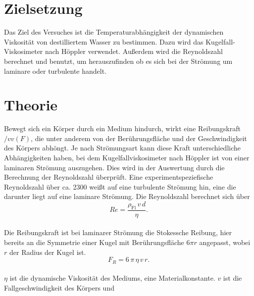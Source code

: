 \section{Zielsetzung}
\label{sec:Zielsetzung}
Das Ziel des Versuches ist die Temperaturabhängigkeit der dynamischen 
Viskosität von destilliertem Wasser zu bestimmen. Dazu wird das Kugelfall-
Viskosimeter nach Höppler verwendet. Außerdem wird die Reynoldszahl 
berechnet und benutzt, um herauszufinden ob es sich bei der Strömung um 
laminare oder turbulente handelt. 
\section{Theorie}
\label{sec:Theorie}
Bewegt sich ein Körper durch ein Medium hindurch, wirkt eine Reibungskraft 
$/vv(F)$, die unter anderem von der Berührungsfläche und der Geschwindigkeit
des Körpers abhöngt. Je nach Strömungsart kann diese Kraft 
unterschiedliche Abhängigkeiten haben, bei dem Kugelfallviskosimeter nach 
Höppler ist von einer laminaren Strömung auszugehen. 
Dies wird in der Auswertung durch die
Berechnung der Reynoldszahl überprüft. Eine experimentspeziefische 
Reynoldszahl über ca. 2300 weißt auf eine turbulente Strömung hin, eine die
darunter liegt auf eine laminare Strömung. Die Reynoldszahl berechnet sich
über $$Re = \frac{\rho_{\text{Fl}}\,v\,d}{\eta}.$$ \\
Die Reibungskraft ist bei laminarer Strömung die Stokessche Reibung, hier 
bereits an die Symmetrie einer Kugel mit Berührungsfläche $6 \pi r$
angepasst, wobei $r$ der Radius der Kugel ist. 
$$F_{R} = 6\,\pi\,\eta\,v\,r.$$ \\
$\eta$ ist die dynamische Viskosität des Mediums, eine Materialkonstante.
$v$ ist die Fallgeschwindigkeit des Körpers und 

\cite{sample}